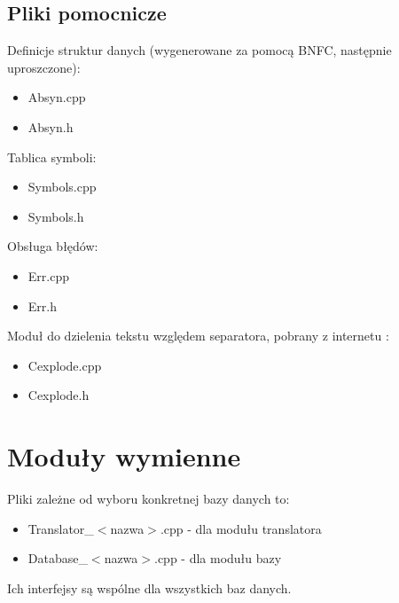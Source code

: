 \section{Pliki pomocnicze}
Definicje struktur danych (wygenerowane za pomocą BNFC, następnie uproszczone):
\begin{itemize}
 \item Absyn.cpp
\item Absyn.h
\end{itemize}
Tablica symboli:
\begin{itemize}
 \item Symbols.cpp
\item Symbols.h
\end{itemize}
Obsługa błędów:
\begin{itemize}
 \item Err.cpp
\item Err.h
\end{itemize}
Moduł do dzielenia tekstu względem separatora, pobrany z internetu \cite{cexplode}:
\begin{itemize}
 \item Cexplode.cpp
 \item Cexplode.h
\end{itemize}


\chapter{Moduły wymienne}
Pliki zależne od wyboru konkretnej bazy danych to:
\begin{itemize}
 \item Translator\_$<$nazwa$>$.cpp - dla modułu translatora
\item Database\_$<$nazwa$>$.cpp - dla modułu bazy
\end{itemize}
Ich interfejsy są wspólne dla wszystkich baz danych.
